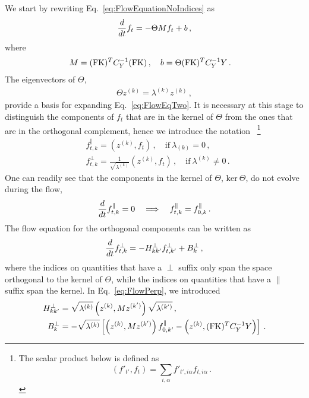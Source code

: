 We start by rewriting Eq.~\eqref{eq:FlowEquationNoIndices} as
\begin{align}
    \label{eq:FlowEqTwo}
    \frac{d}{dt} f_t = -\Theta M f_t + b\, ,
\end{align}
where
\begin{align}
    M &= (\mathrm{FK})^T C_Y^{-1} (\mathrm{FK})\, , \quad b = \Theta (\mathrm{FK})^T C_Y^{-1} Y\, .
\end{align}
The eigenvectors of $\Theta$,
\begin{align}
    \label{eq:ThetaEigensystem}
    \Theta z^{(k)} = \lambda^{(k)} z^{(k)}\, ,
\end{align}
provide a basis for expanding Eq.~\eqref{eq:FlowEqTwo}. It is necessary at this stage to distinguish
the components of $f_t$ that are in the kernel of $\Theta$ from the ones that are in the orthogonal
complement, hence we introduce the notation
~\footnote{
    The scalar product below is defined as
    \[
        \left(f'_{t'}, f_t\right)
            = \sum_{i,\alpha} f'_{t',i\alpha} f_{t,i\alpha}\, .
    \]
}
\begin{align}
    &f^\parallel_{t,k} = \left(z^{(k)}, f_t\right)\, , \quad \text{if}\ \lambda_{(k)} = 0\, , \\
    &f^\perp_{t,k} = \frac{1}{\sqrt{\lambda^{(k)}}} \left(z^{(k)}, f_t\right)\, , \quad
        \text{if}\ \lambda^{(k)} \neq 0\, .
\end{align}
One can readily see that the components in the kernel of $\Theta$, $\text{ker}\ \Theta$,
do not evolve during the flow,
\begin{align}
    \label{eq:FlowParallel}
    \frac{d}{dt} f^\parallel_{t,k} = 0
        \quad \Longrightarrow \quad f^\parallel_{t,k} = f^\parallel_{0,k}\, .
\end{align}
The flow equation for the orthogonal components can be written as
\begin{align}
    \label{eq:FlowPerp}
    \frac{d}{dt} f^\perp_{t,k} = - H^\perp_{kk'} f^\perp_{t,k'}
        + B^\perp_{k}\, ,
\end{align}
where the indices on quantities that have a $\perp$ suffix only span the space orthogonal to the kernel
of $\Theta$, while the indices on quantities that have a $\parallel$ suffix span the kernel.
In Eq.~\eqref{eq:FlowPerp}, we introduced
\begin{align}
    H^\perp_{kk'} &= \sqrt{\lambda^{(k)}} \left(z^{(k)}, M z^{(k')}\right) \sqrt{\lambda^{(k')}}\, ,\\
    B^\perp_k &= -\sqrt{\lambda^{(k)}} \left[\left(z^{(k)}, M z^{(k')}\right) f^\parallel_{0,k'}
        - \left(z^{(k)}, (\mathrm{FK})^T C_Y^{-1} Y\right)\right]\, .
\end{align}
